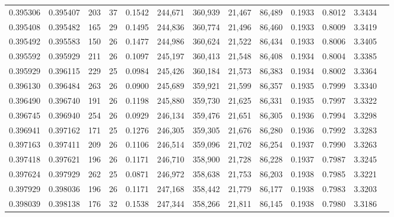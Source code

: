 \begin{tabular}{rrrrrrrrrrrrr}
0.395306 & 0.395407 &   203 &  37 &                                     0.1542 & 244,671 & 360,939 &  21,467 &  86,489 & 0.1933 & 0.8012 & 3.3434 \\
0.395408 & 0.395482 &   165 &  29 &                                     0.1495 & 244,836 & 360,774 &  21,496 &  86,460 & 0.1933 & 0.8009 & 3.3419 \\
0.395492 & 0.395583 &   150 &  26 &                                     0.1477 & 244,986 & 360,624 &  21,522 &  86,434 & 0.1933 & 0.8006 & 3.3405 \\
0.395592 & 0.395929 &   211 &  26 &                                     0.1097 & 245,197 & 360,413 &  21,548 &  86,408 & 0.1934 & 0.8004 & 3.3385 \\
0.395929 & 0.396115 &   229 &  25 &                                     0.0984 & 245,426 & 360,184 &  21,573 &  86,383 & 0.1934 & 0.8002 & 3.3364 \\
0.396130 & 0.396484 &   263 &  26 &                                     0.0900 & 245,689 & 359,921 &  21,599 &  86,357 & 0.1935 & 0.7999 & 3.3340 \\
0.396490 & 0.396740 &   191 &  26 &                                     0.1198 & 245,880 & 359,730 &  21,625 &  86,331 & 0.1935 & 0.7997 & 3.3322 \\
0.396745 & 0.396940 &   254 &  26 &                                     0.0929 & 246,134 & 359,476 &  21,651 &  86,305 & 0.1936 & 0.7994 & 3.3298 \\
0.396941 & 0.397162 &   171 &  25 &                                     0.1276 & 246,305 & 359,305 &  21,676 &  86,280 & 0.1936 & 0.7992 & 3.3283 \\
0.397163 & 0.397411 &   209 &  26 &                                     0.1106 & 246,514 & 359,096 &  21,702 &  86,254 & 0.1937 & 0.7990 & 3.3263 \\
0.397418 & 0.397621 &   196 &  26 &                                     0.1171 & 246,710 & 358,900 &  21,728 &  86,228 & 0.1937 & 0.7987 & 3.3245 \\
0.397624 & 0.397929 &   262 &  25 &                                     0.0871 & 246,972 & 358,638 &  21,753 &  86,203 & 0.1938 & 0.7985 & 3.3221 \\
0.397929 & 0.398036 &   196 &  26 &                                     0.1171 & 247,168 & 358,442 &  21,779 &  86,177 & 0.1938 & 0.7983 & 3.3203 \\
0.398039 & 0.398138 &   176 &  32 &                                     0.1538 & 247,344 & 358,266 &  21,811 &  86,145 & 0.1938 & 0.7980 & 3.3186 \\

\end{tabular}
